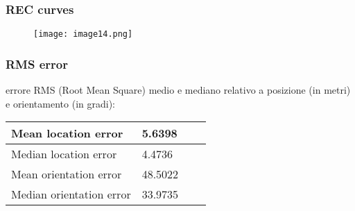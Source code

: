 \subsubsection{REC curves}
\begin{figure}[H]
	\centering
	\texttt{[image: image14.png]}
\end{figure}

\subsubsection{RMS error}
errore RMS (Root Mean Square) medio e mediano relativo a posizione (in metri) e orientamento (in gradi):
\begin{center}
	\begin{tabular}{| l | l | l | l |}
		\hline
		Mean location error & 5.6398 \\ \hline
		Median location error & 4.4736 \\ \hline
		Mean orientation error & 48.5022 \\ \hline
		Median orientation error & 33.9735 \\ \hline							
	\end{tabular}
\end{center}


\newpage
